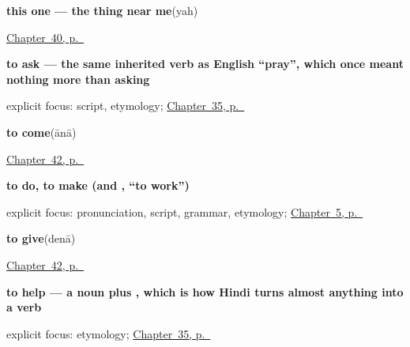 \noindent\begin{minipage}[t]{\linewidth}
\raggedright
\textbf{this one — the thing near me}\enspace\emph{}\enspace(yah)\par
\footnotesize \hyperref[ch:hi-pointing-and-asking]{Chapter~40, p.~\pageref*{ch:hi-pointing-and-asking}}
\end{minipage}\par\smallskip

\noindent\begin{minipage}[t]{\linewidth}
\raggedright
\textbf{to ask — the same inherited verb as English \textquotedblleft{}pray\textquotedblright{}, which once meant nothing more than asking}\enspace\emph{}\par
\footnotesize explicit focus: script, etymology; \hyperref[ch:hi-pasand]{Chapter~35, p.~\pageref*{ch:hi-pasand}}
\end{minipage}\par\smallskip

\noindent\begin{minipage}[t]{\linewidth}
\raggedright
\textbf{to come}\enspace\emph{}\enspace(ānā)\par
\footnotesize \hyperref[ch:hi-more-verbs]{Chapter~42, p.~\pageref*{ch:hi-more-verbs}}
\end{minipage}\par\smallskip

\noindent\begin{minipage}[t]{\linewidth}
\raggedright
\textbf{to do, to make (and  , \textquotedblleft{}to work\textquotedblright{})}\enspace\emph{}\par
\footnotesize explicit focus: pronunciation, script, grammar, etymology; \hyperref[ch:first-verbs]{Chapter~5, p.~\pageref*{ch:first-verbs}}
\end{minipage}\par\smallskip

\noindent\begin{minipage}[t]{\linewidth}
\raggedright
\textbf{to give}\enspace\emph{}\enspace(denā)\par
\footnotesize \hyperref[ch:hi-more-verbs]{Chapter~42, p.~\pageref*{ch:hi-more-verbs}}
\end{minipage}\par\smallskip

\noindent\begin{minipage}[t]{\linewidth}
\raggedright
\textbf{to help — a noun plus , which is how Hindi turns almost anything into a verb}\enspace\emph{ }\par
\footnotesize explicit focus: etymology; \hyperref[ch:hi-pasand]{Chapter~35, p.~\pageref*{ch:hi-pasand}}
\end{minipage}\par\smallskip

